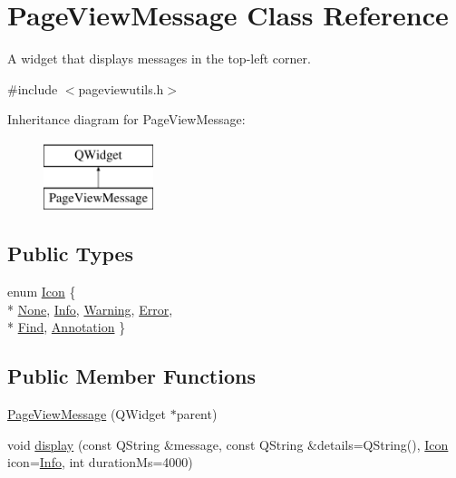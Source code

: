 \hypertarget{classPageViewMessage}{\section{Page\+View\+Message Class Reference}
\label{classPageViewMessage}
}


A widget that displays messages in the top-\/left corner.  




{\ttfamily \#include $<$pageviewutils.\+h$>$}

Inheritance diagram for Page\+View\+Message\+:\begin{figure}[H]
\begin{center}
\leavevmode
\includegraphics[height=2.000000cm]{classPageViewMessage}
\end{center}
\end{figure}
\subsection*{Public Types}
\begin{DoxyCompactItemize}
\item 
enum \hyperlink{classPageViewMessage_aeb83801b92379715663d5a7beaa2ae0c}{Icon} \{ \\*
\hyperlink{classPageViewMessage_aeb83801b92379715663d5a7beaa2ae0ca4d49e997ceb24be7bda744d934b3e65e}{None}, 
\hyperlink{classPageViewMessage_aeb83801b92379715663d5a7beaa2ae0ca2ae901576662b28f92067841a52e11dd}{Info}, 
\hyperlink{classPageViewMessage_aeb83801b92379715663d5a7beaa2ae0ca8d795d55732497f572dde8b9491ce280}{Warning}, 
\hyperlink{classPageViewMessage_aeb83801b92379715663d5a7beaa2ae0ca4fab3e3265e2d4386ce7b7ed21b086cc}{Error}, 
\\*
\hyperlink{classPageViewMessage_aeb83801b92379715663d5a7beaa2ae0cac5541921f6620602ebc759c6a149472a}{Find}, 
\hyperlink{classPageViewMessage_aeb83801b92379715663d5a7beaa2ae0cacc210033b8c3a838c93af708e55cbbd0}{Annotation}
 \}
\end{DoxyCompactItemize}
\subsection*{Public Member Functions}
\begin{DoxyCompactItemize}
\item 
\hyperlink{classPageViewMessage_a509793a17b4e511185f1eeed2637b06c}{Page\+View\+Message} (Q\+Widget $\ast$parent)
\item 
void \hyperlink{classPageViewMessage_a7fd107b1b7a6c0ae64a4d09fc2467982}{display} (const Q\+String \&message, const Q\+String \&details=Q\+String(), \hyperlink{classPageViewMessage_aeb83801b92379715663d5a7beaa2ae0c}{Icon} icon=\hyperlink{classPageViewMessage_aeb83801b92379715663d5a7beaa2ae0ca2ae901576662b28f92067841a52e11dd}{Info}, int duration\+Ms=4000)
\end{DoxyCompactItemize}
